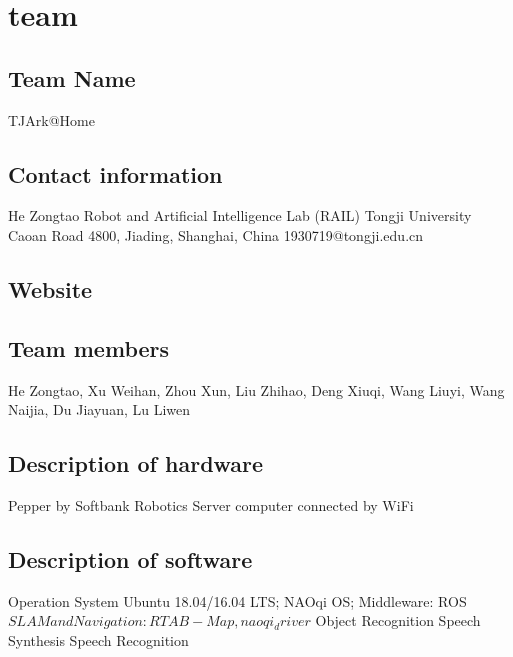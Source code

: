 \section{team}
\label{sec:team}

\subsection*{Team Name}
TJArk@Home

\subsection*{Contact information}
He Zongtao
Robot and Artificial Intelligence Lab (RAIL)
Tongji University
Caoan Road 4800, Jiading, Shanghai, China
1930719@tongji.edu.cn

\subsection*{Website}

\subsection*{Team members}
He Zongtao, Xu Weihan, Zhou Xun, Liu Zhihao, Deng Xiuqi, Wang Liuyi, Wang Naijia, Du Jiayuan, Lu Liwen

\subsection*{Description of hardware}
Pepper by Softbank Robotics
Server computer connected by WiFi

\subsection*{Description of software}
Operation System Ubuntu 18.04/16.04 LTS; NAOqi OS;
Middleware: ROS
$SLAM and Navigation: RTAB-Map, naoqi_driver$
Object Recognition
Speech Synthesis
Speech Recognition